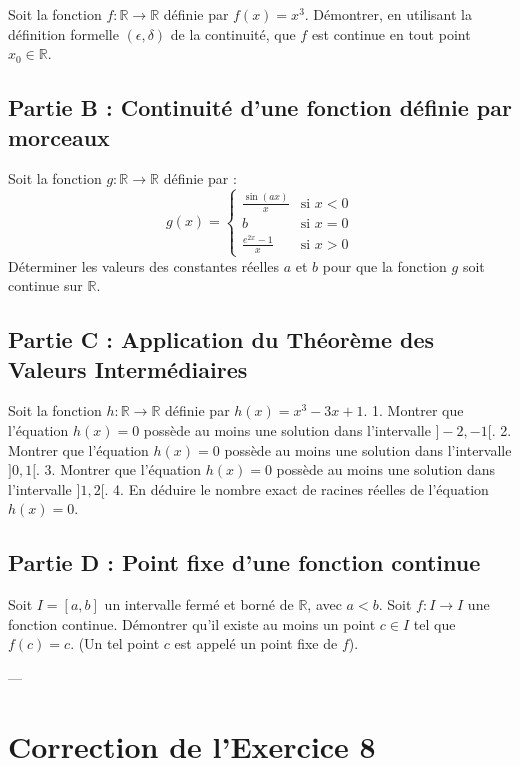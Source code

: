 \documentclass[12pt,a4paper]{report}
\begin{document}
Soit la fonction $f: \mathbb{R} \to \mathbb{R}$ définie par $f(x) = x^3$.
Démontrer, en utilisant la définition formelle $(\epsilon, \delta)$ de la continuité, que $f$ est continue en tout point $x_0 \in \mathbb{R}$.

\subsection{Partie B : Continuité d'une fonction définie par morceaux}

Soit la fonction $g: \mathbb{R} \to \mathbb{R}$ définie par :
$$ g(x) = \begin{cases} \frac{\sin(ax)}{x} & \text{si } x < 0 \\ b & \text{si } x = 0 \\ \frac{e^{2x}-1}{x} & \text{si } x > 0 \end{cases} $$
Déterminer les valeurs des constantes réelles $a$ et $b$ pour que la fonction $g$ soit continue sur $\mathbb{R}$.

\subsection{Partie C : Application du Théorème des Valeurs Intermédiaires}

Soit la fonction $h: \mathbb{R} \to \mathbb{R}$ définie par $h(x) = x^3 - 3x + 1$.
1.  Montrer que l'équation $h(x) = 0$ possède au moins une solution dans l'intervalle $]-2, -1[$.
2.  Montrer que l'équation $h(x) = 0$ possède au moins une solution dans l'intervalle $]0, 1[$.
3.  Montrer que l'équation $h(x) = 0$ possède au moins une solution dans l'intervalle $]1, 2[$.
4.  En déduire le nombre exact de racines réelles de l'équation $h(x) = 0$.

\subsection{Partie D : Point fixe d'une fonction continue}

Soit $I = [a, b]$ un intervalle fermé et borné de $\mathbb{R}$, avec $a < b$. Soit $f: I \to I$ une fonction continue.
Démontrer qu'il existe au moins un point $c \in I$ tel que $f(c) = c$. (Un tel point $c$ est appelé un point fixe de $f$).

---

\section{Correction de l'Exercice 8}
\end{document}
